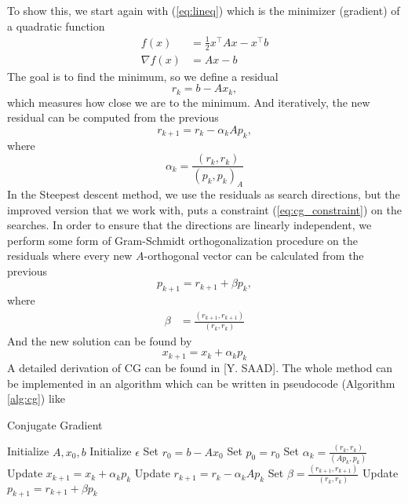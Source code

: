 To show this, we start again with (\ref{eq:lineq}) which is the minimizer (gradient) of a quadratic function
\begin{equation}
    \begin{aligned}
        f(x) &= \frac{1}{2} x^\top A x - x^\top b
        \\
        \nabla f(x) &=  Ax - b
    \end{aligned}
\end{equation}
The goal is to find the minimum, so we define a residual 
\begin{equation}
    r_k = b - Ax_k,
\end{equation}
which measures how close we are to the minimum. And iteratively, the new residual can be computed from the previous
\begin{equation}
    r_{k+1} = r_k - \alpha_k Ap_k,
\end{equation}
where
\begin{equation}
    \alpha_k = \frac{\left( r_k, r_k \right)}{\left( p_k, p_k \right)_A}
\end{equation}
In the Steepest descent method, we use the residuals as search directions, but the improved version that we work with, puts a constraint (\ref{eq:cg_constraint}) on the searches. In order to ensure that the directions are linearly independent, we perform some form of Gram-Schmidt orthogonalization procedure on the residuals where every new $A$-orthogonal vector can be calculated from the previous
\begin{equation}
    p_{k+1} = r_{k+1} + \beta p_k,
\end{equation}
where
\begin{align}
    \beta &= \frac{\left( r_{k+1}, r_{k+1} \right)}{\left( r_k, r_k \right)}
\end{align}
And the new solution can be found by
\begin{equation}
    x_{k+1} = x_k + \alpha_k p_k
\end{equation}
A detailed derivation of CG can be found in [Y. SAAD]. The whole method can be implemented in an algorithm which can be written in pseudocode (Algorithm \ref{alg:cg}) like

\begin{algorithm}
    \caption{Conjugate Gradient}
    \begin{algorithmic}[1]
        \State Initialize  $A, x_0, b$
        \State Initialize $\epsilon$ 
        \State Set $r_0 = b - Ax_0$ 
        \State Set $p_0 = r_0$ 
            \State Set $\alpha_k = \frac{\left( r_k, r_k \right)}{\left( Ap_k, p_k \right)}$
            \State Update $x_{k+1} = x_k + \alpha_k p_k$
            \State Update $r_{k+1} = r_k - \alpha_k Ap_k$
            \State Set $\beta = \frac{\left( r_{k+1}, r_{k+1} \right)}{\left( r_k, r_k \right)}$
            \State Update $p_{k+1} = r_{k+1} + \beta p_k$
        \EndWhile
    \end{algorithmic}
    \label{alg:cg}
    \end{algorithm}

